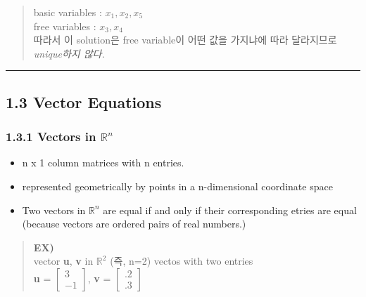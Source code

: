 \documentclass[11pt]{article}
\providecommand{\tightlist}{%
      \setlength{\itemsep}{0pt}\setlength{\parskip}{0pt}}
\begin{document}
\begin{quote}
basic variables : \(x_{1}, x_{2}, x_{5}\)\\
free variables : \(x_{3}, x_{4}\)\\
따라서 이 solution은 free variable이 어떤 값을 가지냐에 따라 달라지므로
\emph{unique하지 않다.}
\end{quote}

    \begin{center}\rule{0.5\linewidth}{\linethickness}\end{center}

\hypertarget{vector-equations}{%
\subsection{1.3 Vector Equations}\label{vector-equations}}

\hypertarget{vectors-in-mathbbrn}{%
\subsubsection{\texorpdfstring{1.3.1 Vectors in
\(\mathbb{R}^n\)}{1.3.1 Vectors in \textbackslash{}mathbb\{R\}\^{}n}}\label{vectors-in-mathbbrn}}

\begin{itemize}
\tightlist
\item
  n x 1 column matrices with n entries.
\item
  represented geometrically by points in a n-dimensional coordinate
  space
\item
  Two vectors in \(\mathbb{R}^n\) are equal if and only if their
  corresponding etries are equal (because vectors are ordered pairs of
  real numbers.)
\end{itemize}

\begin{quote}
\textbf{EX)}\\
vector \textbf{u}, \textbf{v} in \(\mathbb{R}^2\) (즉, n=2) vectos with
two entries\\
\textbf{u} = \(\begin{bmatrix} 3 \\ -1 \end{bmatrix}\), \textbf{v} =
\(\begin{bmatrix} .2 \\ .3 \end{bmatrix}\)
\end{quote}
\end{document}

